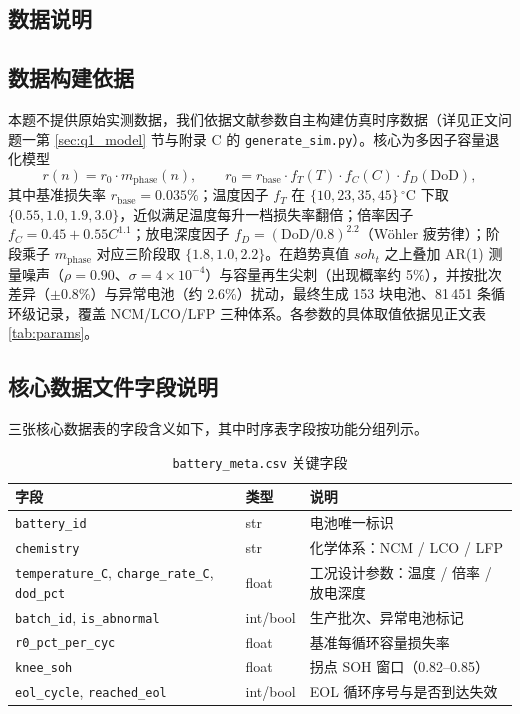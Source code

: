 \documentclass[withoutpreface]{cumcmthesis}
\begin{document}
\begin{appendices}
\section{数据说明}

\subsection{数据构建依据}
本题不提供原始实测数据，我们依据文献参数自主构建仿真时序数据（详见正文问题一第 \ref{sec:q1_model} 节与附录 C 的 \texttt{generate\_sim.py}）。核心为多因子容量退化模型
\[
r(n)=r_{0}\cdot m_{\mathrm{phase}}(n),\qquad r_{0}=r_{\mathrm{base}}\cdot f_{T}(T)\cdot f_{C}(C)\cdot f_{D}(\mathrm{DoD}),
\]
其中基准损失率 $r_{\mathrm{base}}=0.035\%$；温度因子 $f_{T}$ 在 $\{10,23,35,45\}\,^\circ$C 下取 $\{0.55,1.0,1.9,3.0\}$，近似满足温度每升一档损失率翻倍；倍率因子 $f_C=0.45+0.55C^{1.1}$；放电深度因子 $f_D=(\mathrm{DoD}/0.8)^{2.2}$（Wöhler 疲劳律）；阶段乘子 $m_{\mathrm{phase}}$ 对应三阶段取 $\{1.8,1.0,2.2\}$。在趋势真值 $soh_t$ 之上叠加 AR(1) 测量噪声（$\rho=0.90$、$\sigma=4\times10^{-4}$）与容量再生尖刺（出现概率约 5\%），并按批次差异（$\pm0.8\%$）与异常电池（约 2.6\%）扰动，最终生成 153 块电池、81\,451 条循环级记录，覆盖 NCM/LCO/LFP 三种体系。各参数的具体取值依据见正文表 \ref{tab:params}。

\subsection{核心数据文件字段说明}
三张核心数据表的字段含义如下，其中时序表字段按功能分组列示。

\begin{table}[H]
\centering
\small
\begin{tabularx}{\textwidth}{LLL}
\toprule
字段 & 类型 & 说明 \\
\midrule
\texttt{battery\_id} & str & 电池唯一标识 \\
\texttt{chemistry} & str & 化学体系：NCM / LCO / LFP \\
\texttt{temperature\_C}, \texttt{charge\_rate\_C}, \texttt{dod\_pct} & float & 工况设计参数：温度 / 倍率 / 放电深度 \\
\texttt{batch\_id}, \texttt{is\_abnormal} & int/bool & 生产批次、异常电池标记 \\
\texttt{r0\_pct\_per\_cyc} & float & 基准每循环容量损失率 \\
\texttt{knee\_soh} & float & 拐点 SOH 窗口（0.82--0.85） \\
\texttt{eol\_cycle}, \texttt{reached\_eol} & int/bool & EOL 循环序号与是否到达失效 \\
\bottomrule
\end{tabularx}
\caption{\texttt{battery\_meta.csv} 关键字段}
\end{table}


\end{appendices}
\end{document}
